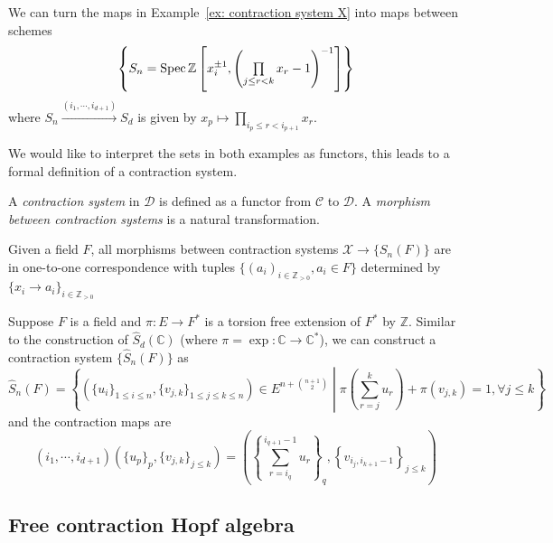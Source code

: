 \begin{example}
We can turn the maps in Example~\ref{ex: contraction system X} into maps between schemes
\[
\left\{S_n=\operatorname{Spec}\mathbb Z\left[x_i^{\pm1},\left(\textstyle\prod\limits_{j\leq r<k}x_r-1\right)^{-1}\right]\right\}
\]
where $S_n\xrightarrow{(i_1,\cdots,i_{d+1})} S_d$ is given by $x_p\mapsto\prod\limits_{i_p\leq r<i_{p+1}}x_r$.
\end{example}

We would like to interpret the sets in both examples as functors, this leads to a formal definition of a contraction system.

\begin{definition}
A \textit{contraction system} in $\mathscr D$ is defined as a functor from $\mathscr C$ to $\mathscr D$. A \textit{morphism between contraction systems} is a natural transformation.
\end{definition}

\begin{example}
Given a field $F$, all morphisms between contraction systems $\mathcal X\to\{S_n(F)\}$ are in one-to-one correspondence with tuples $\{(a_i)_{i\in\mathbb Z_{>0}}, a_i\in F\}$ determined by $\{x_i\to a_i\}_{i\in\mathbb Z_{>0}}$
\end{example}

\begin{example}\label{ex: SnHat(F)}
Suppose $F$ is a field and $\pi:E\to F^*$ is a torsion free extension of $F^*$ by $\mathbb Z$. Similar to the construction of $\widehat S_d(\mathbb C)$ (where $\pi=\exp:\mathbb C\to\mathbb C^*$), we can construct a contraction system $\{\widehat S_n(F)\}$ as
\begin{equation}
\widehat S_n(F)=\left\{\left(\{u_i\}_{1\leq i\leq n},\{v_{j,k}\}_{1\leq j\leq k\leq n}\right)\in E^{n+\binom{n+1}{2}}\middle|\pi\left(\textstyle\sum_{r=j}^k u_r\right)+\pi(v_{j,k})=1,\forall j\leq k\right\}
\end{equation}
and the contraction maps are
\begin{equation}
(i_1,\cdots,i_{d+1})\left(\{u_p\}_{p},\{v_{j,k}\}_{j\leq k}\right)=\left(\left\{\textstyle\sum_{r=i_q}^{i_{q+1}-1}u_r\right\}_q,\left\{v_{i_j,i_{k+1}-1}\right\}_{j\leq k}\right)
\end{equation}
\end{example}

\subsection{Free contraction Hopf algebra}

